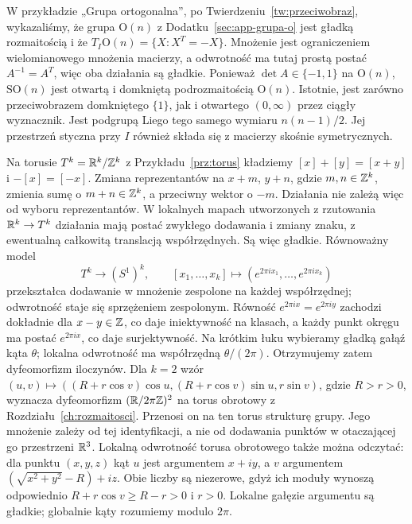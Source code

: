 \begin{przyklad}
\label{prz:orth-liego}
W przykładzie „Grupa ortogonalna”, po
Twierdzeniu~\ref{tw:przeciwobraz}, wykazaliśmy, że
grupa $\mathrm O(n)$ z Dodatku~\ref{sec:app-grupa-o}
jest gładką rozmaitością i że
$T_I\mathrm O(n)=\{X:X^T=-X\}$. Mnożenie jest ograniczeniem
wielomianowego mnożenia macierzy, a odwrotność ma tutaj prostą
postać $A^{-1}=A^T$, więc oba działania są gładkie.
Ponieważ $\det A\in\{-1,1\}$ na $\mathrm O(n)$,
$\mathrm{SO}(n)$ jest
otwartą i domkniętą podrozmaitością $\mathrm O(n)$.
Istotnie, jest zarówno przeciwobrazem domkniętego $\{1\}$,
jak i otwartego $(0,\infty)$ przez ciągły wyznacznik.
Jest podgrupą Liego tego samego wymiaru $n(n-1)/2$.
Jej przestrzeń styczna przy $I$ również składa się z
macierzy skośnie symetrycznych.
\end{przyklad}

\begin{przyklad}
\label{prz:torus-liego}
Na torusie $T^k=\mathbb{R}^k/\mathbb{Z}^k$ z Przykładu~\ref{prz:torus}
kładziemy $[x]+[y]=[x+y]$ i $-[x]=[-x]$.
Zmiana reprezentantów na $x+m$, $y+n$, gdzie $m,n\in\mathbb{Z}^k$,
zmienia sumę o $m+n\in\mathbb{Z}^k$, a przeciwny wektor o $-m$.
Działania nie zależą więc od wyboru reprezentantów.
W lokalnych mapach
utworzonych z rzutowania $\mathbb{R}^k\to T^k$ działania mają postać
zwykłego dodawania i zmiany znaku, z ewentualną całkowitą
translacją współrzędnych. Są więc gładkie. Równoważny model
\[
 T^k\longrightarrow(S^1)^k,\qquad
 [x_1,\ldots,x_k]\longmapsto
 (e^{2\pi i x_1},\ldots,e^{2\pi i x_k})
\]
przekształca dodawanie w mnożenie zespolone na każdej współrzędnej;
odwrotność staje się sprzężeniem zespolonym.
Równość $e^{2\pi i x}=e^{2\pi i y}$ zachodzi dokładnie dla
$x-y\in\mathbb{Z}$, co daje iniektywność na klasach, a każdy punkt
okręgu ma postać $e^{2\pi i x}$, co daje surjektywność.
Na krótkim łuku wybieramy gładką gałąź kąta $\theta$;
lokalna odwrotność ma współrzędną $\theta/(2\pi)$.
Otrzymujemy zatem dyfeomorfizm iloczynów.
Dla $k=2$ wzór
$(u,v)\mapsto((R+r\cos v)\cos u,(R+r\cos v)\sin u,r\sin v)$,
gdzie $R>r>0$, wyznacza dyfeomorfizm
$(\mathbb{R}/2\pi\mathbb{Z})^2$ na torus obrotowy z
Rozdziału~\ref{ch:rozmaitosci}. Przenosi on na ten torus
strukturę grupy. Jego mnożenie zależy od tej identyfikacji, a nie
od dodawania punktów w otaczającej go przestrzeni $\mathbb{R}^3$.
Lokalną odwrotność torusa obrotowego także można odczytać:
dla punktu $(x,y,z)$ kąt $u$ jest argumentem $x+iy$,
a $v$ argumentem $(\sqrt{x^2+y^2}-R)+iz$.
Obie liczby są niezerowe, gdyż ich moduły wynoszą odpowiednio
$R+r\cos v\geq R-r>0$ i $r>0$.
Lokalne gałęzie argumentu są gładkie; globalnie kąty
rozumiemy modulo $2\pi$.
\end{przyklad}

